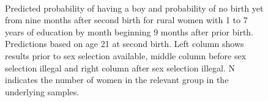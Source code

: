 \documentclass[12pt,letterpaper]{article}
\begin{document}
\begin{figure}[htpb]
{\begin{minipage}{0.31\textwidth}
        \captionsetup[subfigure]{labelformat=empty,position=top,captionskip=-1pt,farskip=-0.5pt}
        \\
        \captionsetup[subfigure]{labelformat=parens}
    \end{minipage}
}
\setcounter{subfigure}{3}
\caption{Predicted probability of having a boy and probability of
no birth yet from nine months after second birth for rural
women with 1 to 7 years of education by month beginning 9 months after prior birth. 
Predictions based on age 21 at second birth.
Left column shows results prior to sex selection available, middle column before
sex selection illegal and right column after sex selection illegal.
N indicates the number of women in the relevant group in the underlying samples.
}
\label{fig:results_spell3_med_rural}
\end{figure}
\end{document}
